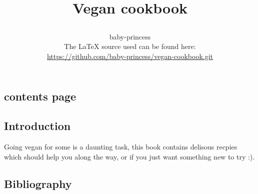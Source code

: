 \documentclass[a4paper,12pt,titlepage]{article}
\author{%
baby-princess \\
The LaTeX source used can be found here: \\
\url{https://github.com/baby-princess/vegan-cookbook.git}}
\title{
\titlehead{\centering\texttt{[image: CC-SA.png]}}\\
Vegan cookbook
}
\begin{document}
\maketitle
\begin{centering}
\section{contents page}
\end{centering}
\tableofcontents
\newpage
\begin{centering}
\section{Introduction}
\end{centering}
Going vegan for some is a daunting task, this book contains delisous recpies which should help you along the way, or if you just want something new to try :).
\newpage

% 



\newpage
\begin{centering}
\section{Bibliography}
\end{centering}
\begin{refsection}



\printbibliography
\end{refsection}
\end{document}
